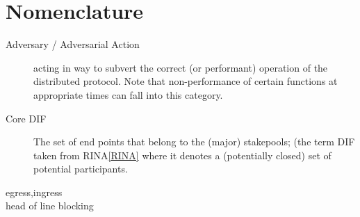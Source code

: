 \documentclass{report}
\theoremstyle{definition}{
  \newtheorem{lemma}{Lemma}[section] %
  \newtheorem{definition}[lemma]{Definition}
}
\theoremstyle{theorem}{
  \newtheorem{invariant}[lemma]{Invariant}
  \newtheorem{proofobligation}[lemma]{Proof Obligation}
}
\numberwithin{equation}{lemma}
\begin{document}
\chapter{Nomenclature}
\begin{description}
\item[Adversary / Adversarial Action]
  acting in way to subvert the correct (or performant) operation of the distributed protocol.
  Note that non-performance of certain functions at appropriate times can
  fall into this category.
\item[Core DIF]
  The set of end points that belong to the (major)
  stakepools; (the term DIF taken from RINA\ref{RINA} where it denotes
  a (potentially closed) set of potential participants.
\item[egress,ingress]
\item[head of line blocking]
\end{description}
\end{document}

